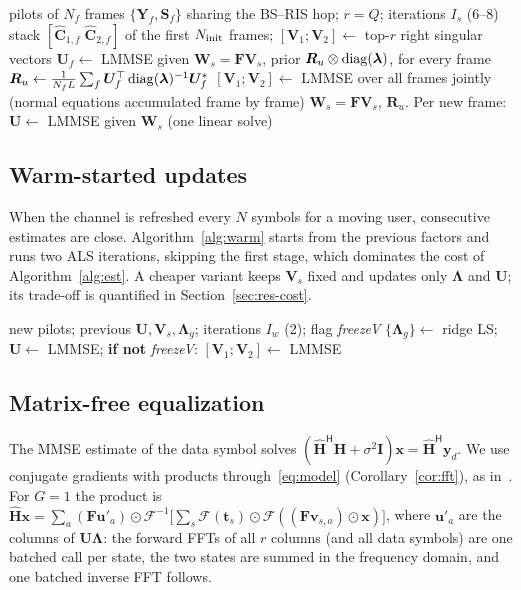 \begin{algorithm}[!htbp]
\caption{Learning the static input side over $N_f$ frames (slow timescale)}\label{alg:learn}
\begin{algorithmic}[1]
\Require pilots of $N_f$ frames $\{\bm Y_f,\bm S_f\}$ sharing the BS--RIS hop; $r=Q$; iterations $I_s$ (6--8)
\State stack $[\hat{\bm C}_{1,f}\;\hat{\bm C}_{2,f}]$ of the first $N_{\rm init}$ frames; $[\bm V_1;\bm V_2]\gets$ top-$r$ right singular vectors
  \State $\bm U_f\gets$ LMMSE given $\bm W_s=\bm F\bm V_s$, prior $\bm R_u\otimes\operatorname{diag}(\bm\lambda)$, for every frame
  \State $\bm R_u\gets\frac{1}{N_fL}\sum_f\bm U_f^{\top}\operatorname{diag}(\bm\lambda)^{-1}\bm U_f^{*}$
  \State $[\bm V_1;\bm V_2]\gets$ LMMSE over all frames jointly (normal equations accumulated frame by frame)
\EndFor
\State \Return $\bm W_s=\bm F\bm V_s$, $\bm R_u$. Per new frame: $\bm U\gets$ LMMSE given $\bm W_s$ (one linear solve)
\end{algorithmic}
\end{algorithm}

\subsection{Warm-started updates}\label{sec:warm}
When the channel is refreshed every $N$ symbols for a moving user, consecutive estimates
are close. Algorithm~\ref{alg:warm} starts from the previous factors and runs two ALS
iterations, skipping the first stage, which dominates the cost of Algorithm~\ref{alg:est}.
A cheaper variant keeps $\bm V_s$ fixed and updates only $\bm\Lambda$ and $\bm U$; its trade-off is
quantified in Section~\ref{sec:res-cost}.

\begin{algorithm}[!htbp]
\caption{Warm-started refresh}\label{alg:warm}
\begin{algorithmic}[1]
\Require new pilots; previous $\bm U,\bm V_s,\bm\Lambda_g$; iterations $I_w$ (2); flag \emph{freezeV}
  \State $\{\bm\Lambda_g\}\gets$ ridge LS; $\bm U\gets$ LMMSE; \textbf{if not} \emph{freezeV}: $[\bm V_1;\bm V_2]\gets$ LMMSE
\EndFor
\end{algorithmic}
\end{algorithm}

\subsection{Matrix-free equalization}\label{sec:eq}
The MMSE estimate of the data symbol solves
$(\hat{\bm H}^{\mathsf H}\hat{\bm H}+\sigma^2\bm I)\bm x=\hat{\bm H}^{\mathsf H}\bm y_d$. We use conjugate
gradients with products through~\eqref{eq:model} (Corollary~\ref{cor:fft}), as
in~\cite{hrycak2010}. For $G=1$ the product is
$\hat{\bm H}\bm x=\sum_{a}(\bm F\bm u'_a)\odot\mathcal F^{-1}\big[\sum_s\mathcal F(\bm t_s)\odot\mathcal F((\bm F\bm v_{s,a})\odot\bm x)\big]$,
where $\bm u'_a$ are the columns of $\bm U\bm\Lambda$: the forward FFTs of all $r$ columns
(and all data symbols) are one batched call per state, the two states are summed in the
frequency domain, and one batched inverse FFT follows.

